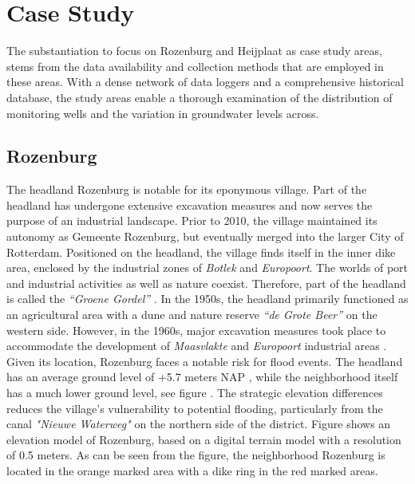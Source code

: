 \chapter{Case Study}
\label{chapter: Case Study}

The substantiation to focus on Rozenburg and Heijplaat as case study areas, stems from the data availability and collection methods that are employed in these areas. With a dense network of data loggers and a comprehensive historical database, the study areas enable a thorough examination of the distribution of monitoring wells and the variation in groundwater levels across.

\section{Rozenburg}
The headland Rozenburg is notable for its eponymous village. Part of the headland has undergone extensive excavation measures and now serves the purpose of an industrial landscape. Prior to 2010, the village maintained its autonomy as Gemeente Rozenburg, but eventually merged into the larger City of Rotterdam. Positioned on the headland, the village finds itself in the inner dike area, enclosed by the industrial zones of \textit{Botlek} and \textit{Europoort}. The worlds of port and industrial activities as well as nature coexist. Therefore, part of the headland is called the \textit{“Groene Gordel” } \cite{port-of-rotterdam-no-date}. In the 1950s, the headland primarily functioned as an agricultural area with a dune and nature reserve \textit{“de Grote Beer” }on the western side. However, in the 1960s, major excavation measures took place to accommodate the development of \textit{Maasvlakte} and \textit{Europoort} industrial areas \cite{damme-jongsten-2008}. Given its location, Rozenburg faces a notable risk for flood events. The headland has an average ground level of +5.7 meters NAP \cite{visch-2022}, while the neighborhood itself has a much lower ground level, see figure . The strategic elevation differences reduces the village's vulnerability to potential flooding, particularly from the canal \textit{"Nieuwe Waterweg"} on the northern side of the district. Figure  shows an elevation model of Rozenburg, based on a digital terrain model with a resolution of 0.5 meters. As can be seen from the figure, the neighborhood Rozenburg is located in the orange marked area with a dike ring in the red marked areas. \\
